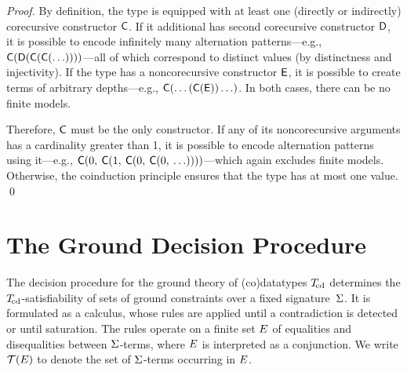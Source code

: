 \begin{report}
\begin{proof}
By definition, the type is equipped with at least one (directly or indirectly)
corecursive constructor $\textsf{C}$. If it additional has second
corecursive constructor $\textsf{D}$, it is possible to encode infinitely many
alternation patterns---e.g.,
$\textsf{C}(\textsf{D}(\textsf{C}(\textsf{C}(\ldots))))$---all of which correspond
to distinct values (by distinctness and injectivity). If the type has a
noncorecursive constructor $\textsf{E}$, it is possible to create terms of
arbitrary depths---e.g., $\textsf{C}(\ldots(\textsf{C}(\textsf{E}))\ldots)$. In
both cases, there can be no finite models.

Therefore, $\textsf{C}$ must be the only constructor.
If any of its noncorecursive arguments has a cardinality greater than 1,
it is possible to encode alternation patterns using it---e.g.,
$\textsf{C}(0,\: \textsf{C}(1,\: \textsf{C}(0,\: \textsf{C}(0,\: \ldots))))$---which
again excludes finite models. Otherwise, the coinduction principle ensures
that the type has at most one value.
\qed
\end{proof}
\end{report}


\section{The Ground Decision Procedure} %
\label{sec:a-ground-decision-procedure-for-co-datatypes}

The decision procedure for the ground theory of (co)datatypes $T_{\!\mathrm{cd}}$ determines the
$T_{\!\mathrm{cd}}$-satisfiability of sets of ground constraints over a fixed
signature~$\mathrm{\Sigma}$. It is formulated as a calculus, whose rules are applied
until a contradiction is detected or until saturation.
%
The rules operate on a finite set $E$ of equalities and disequalities
between $\mathrm{\Sigma}$-terms, where $E$ is interpreted as a conjunction.
We write $\mathcal{T}(E)$ to denote the set of $\mathrm{\Sigma}$-terms occurring in $E$.

